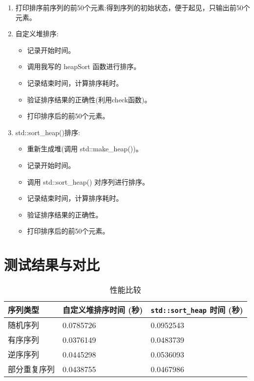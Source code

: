 \documentclass{article}
\begin{document}
    \begin{enumerate}
        \item 打印排序前序列的前50个元素:得到序列的初始状态，便于起见，只输出前50个元素。

        \item 自定义堆排序:
        \begin{itemize}
            \item 记录开始时间。
            \item 调用我写的 heapSort 函数进行排序。
            \item 记录结束时间，计算排序耗时。
            \item 验证排序结果的正确性(利用check函数)。
            \item 打印排序后的前50个元素。
        \end{itemize}

        \item std::sort\_heap()排序:
        \begin{itemize}
            \item 重新生成堆(调用 std::make\_heap())。
            \item 记录开始时间。
            \item 调用 std::sort\_heap() 对序列进行排序。
            \item 记录结束时间，计算排序耗时。
            \item 验证排序结果的正确性。
            \item 打印排序后的前50个元素。
        \end{itemize}

    \end{enumerate}

    \section{测试结果与对比}

\begin{table}[h!]
\centering
\begin{tabular}{@{}lll@{}}
\toprule
序列类型 & 自定义堆排序时间 (秒) & \lstinline|std::sort_heap| 时间 (秒) \\ \midrule
随机序列 & 0.0785726 & 0.0952543 \\
有序序列 & 0.0376149 & 0.0483739 \\
逆序序列 & 0.0445298 & 0.0536093 \\
部分重复序列 & 0.0438755 & 0.0467986 \\ \bottomrule
\end{tabular}
\caption{性能比较}
\label{tab:performance_comparison}
\end{table}
\end{document}
